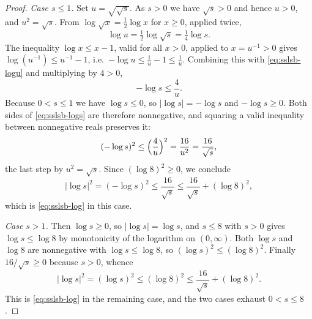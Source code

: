 \begin{proof}
\emph{Case $s\le 1$.} Set $u=\sqrt{\sqrt{s}}$. As $s>0$ we have $\sqrt{s}>0$ and
hence $u>0$, and $u^2=\sqrt{s}$. From $\log\sqrt{x}=\tfrac12\log x$ for $x\ge 0$,
applied twice,
\begin{equation}\label{eq:sslsb-logu}
  \log u=\tfrac12\log\sqrt{s}=\tfrac14\log s .
\end{equation}
The inequality $\log x\le x-1$, valid for all $x>0$, applied to $x=u^{-1}>0$
gives $\log(u^{-1})\le u^{-1}-1$, i.e.\ $-\log u\le \frac{1}{u}-1\le\frac1u$.
Combining this with \eqref{eq:sslsb-logu} and multiplying by $4>0$,
\begin{equation}\label{eq:sslsb-logs}
  -\log s\le\frac{4}{u}.
\end{equation}
Because $0<s\le 1$ we have $\log s\le 0$, so $|\log s|=-\log s$ and
$-\log s\ge 0$. Both sides of \eqref{eq:sslsb-logs} are therefore nonnegative,
and squaring a valid inequality between nonnegative reals preserves it:
\[
  (-\log s)^2\le\Bigl(\frac{4}{u}\Bigr)^2=\frac{16}{u^2}=\frac{16}{\sqrt{s}},
\]
the last step by $u^2=\sqrt s$. Since $(\log 8)^2\ge 0$, we conclude
\[
  |\log s|^2=(-\log s)^2\le\frac{16}{\sqrt{s}}\le\frac{16}{\sqrt{s}}+(\log 8)^2 ,
\]
which is \eqref{eq:sslsb-log} in this case.

\emph{Case $s>1$.} Then $\log s\ge 0$, so $|\log s|=\log s$, and $s\le 8$ with
$s>0$ gives $\log s\le\log 8$ by monotonicity of the logarithm on $(0,\infty)$.
Both $\log s$ and $\log 8$ are nonnegative with $\log s\le\log 8$, so
$(\log s)^2\le(\log 8)^2$. Finally $16/\sqrt{s}\ge 0$ because $s>0$, whence
\[
  |\log s|^2=(\log s)^2\le(\log 8)^2\le\frac{16}{\sqrt{s}}+(\log 8)^2 .
\]
This is \eqref{eq:sslsb-log} in the remaining case, and the two cases exhaust
$0<s\le 8$.
\end{proof}
